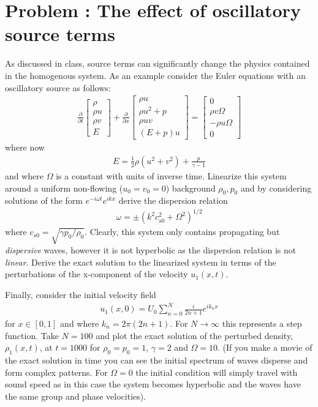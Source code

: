 \documentclass[11pt]{article}
\newcounter{probnum}
\begin{document}
\section*{Problem : The effect of oscillatory source
  terms}

As discussed in class, source terms can significantly change the
physics contained in the homogenous system. As an example consider the
Euler equations with an oscillatory source as follows:
\begin{align*}
  \frac{\partial}{\partial{t}}
  \left[
    \begin{matrix}
      \rho \\
      \rho u \\
      \rho v \\      
      E
    \end{matrix}
  \right]
  +
  \frac{\partial}{\partial{x}}
  \left[
    \begin{matrix}
      \rho u \\
      \rho u^2 + p \\
      \rho u v \\
      (E+p)u
    \end{matrix}
  \right]
  =
  \left[
    \begin{matrix}
      0 \\
      \rho v\Omega \\
      -\rho u\Omega  \\
      0
    \end{matrix}
  \right]  
\end{align*}
where now
\begin{align*}
  E = \frac{1}{2}\rho (u^2+v^2) + \frac{p}{\gamma-1}
\end{align*}
and where $\Omega$ is a constant with units of inverse time. Linearize
this system around a uniform non-flowing ($u_0 = v_0 = 0$) background
$\rho_0, p_0$ and by considering solutions of the form
$e^{-i\omega t}e^{i kx }$ derive the dispersion relation
\begin{align*}
  \omega = \pm (k^2 c_{s0}^2 + \Omega^2)^{1/2}
\end{align*}
where $c_{s0} = \sqrt{\gamma p_0/\rho_0}$. Clearly, this system only
contains propagating but \emph{dispersive} waves, however it is not
hyperbolic as the dispersion relation is not \emph{linear}. Derive the
exact solution to the linearized system in terms of the perturbations
of the x-component of the velocity $u_1(x,t)$.

Finally, consider the initial velocity field
\begin{align*}
  u_1(x,0) = U_0 \sum_{n=0}^N \frac{i}{2n + 1} e^{i k_n x}
\end{align*}
for $x\in [0,1]$ and where $k_n = 2\pi (2n+1)$. For
$N\rightarrow \infty$ this represents a step function. Take $N=100$
and plot the exact solution of the perturbed density, $\rho_1(x,t)$,
at $t=1000$ for $\rho_0 = p_0 = 1$, $\gamma = 2$ and $\Omega =
10$. (If you make a movie of the exact solution in time you can see
the initial spectrum of waves disperse and form complex patterns. For
$\Omega = 0$ the initial condition will simply travel with sound speed
as in this case the system becomes hyperbolic and the waves have the
same group and phase velocities).
\end{document}
